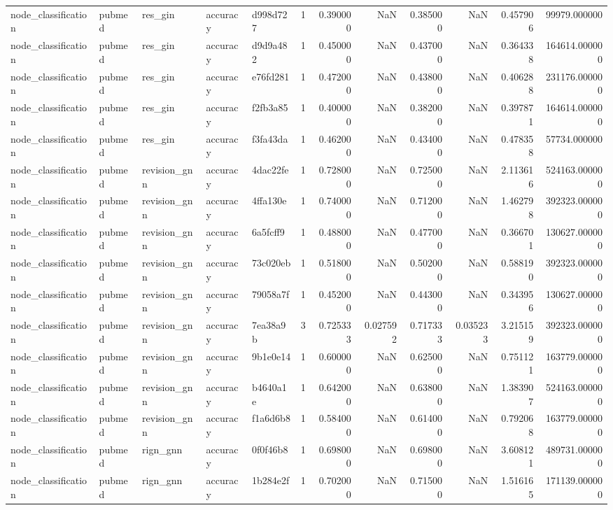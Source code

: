 \begin{tabular}{lllllrrrrrrr}
node_classification & pubmed & res_gin & accuracy & d998d727 & 1 & 0.390000 & NaN & 0.385000 & NaN & 0.457906 & 99979.000000 \\
node_classification & pubmed & res_gin & accuracy & d9d9a482 & 1 & 0.450000 & NaN & 0.437000 & NaN & 0.364338 & 164614.000000 \\
node_classification & pubmed & res_gin & accuracy & e76fd281 & 1 & 0.472000 & NaN & 0.438000 & NaN & 0.406288 & 231176.000000 \\
node_classification & pubmed & res_gin & accuracy & f2fb3a85 & 1 & 0.400000 & NaN & 0.382000 & NaN & 0.397871 & 164614.000000 \\
node_classification & pubmed & res_gin & accuracy & f3fa43da & 1 & 0.462000 & NaN & 0.434000 & NaN & 0.478358 & 57734.000000 \\
node_classification & pubmed & revision_gnn & accuracy & 4dac22fe & 1 & 0.728000 & NaN & 0.725000 & NaN & 2.113616 & 524163.000000 \\
node_classification & pubmed & revision_gnn & accuracy & 4ffa130e & 1 & 0.740000 & NaN & 0.712000 & NaN & 1.462798 & 392323.000000 \\
node_classification & pubmed & revision_gnn & accuracy & 6a5fcff9 & 1 & 0.488000 & NaN & 0.477000 & NaN & 0.366701 & 130627.000000 \\
node_classification & pubmed & revision_gnn & accuracy & 73c020eb & 1 & 0.518000 & NaN & 0.502000 & NaN & 0.588190 & 392323.000000 \\
node_classification & pubmed & revision_gnn & accuracy & 79058a7f & 1 & 0.452000 & NaN & 0.443000 & NaN & 0.343956 & 130627.000000 \\
node_classification & pubmed & revision_gnn & accuracy & 7ea38a9b & 3 & 0.725333 & 0.027592 & 0.717333 & 0.035233 & 3.215159 & 392323.000000 \\
node_classification & pubmed & revision_gnn & accuracy & 9b1e0e14 & 1 & 0.600000 & NaN & 0.625000 & NaN & 0.751121 & 163779.000000 \\
node_classification & pubmed & revision_gnn & accuracy & b4640a1e & 1 & 0.642000 & NaN & 0.638000 & NaN & 1.383907 & 524163.000000 \\
node_classification & pubmed & revision_gnn & accuracy & f1a6d6b8 & 1 & 0.584000 & NaN & 0.614000 & NaN & 0.792068 & 163779.000000 \\
node_classification & pubmed & rign_gnn & accuracy & 0f0f46b8 & 1 & 0.698000 & NaN & 0.698000 & NaN & 3.608121 & 489731.000000 \\
node_classification & pubmed & rign_gnn & accuracy & 1b284e2f & 1 & 0.702000 & NaN & 0.715000 & NaN & 1.516165 & 171139.000000 \\

\end{tabular}
